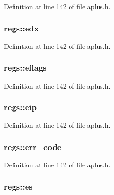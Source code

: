 Definition at line 142 of file aplus.\+h.

\hypertarget{structregs_a63133abf1974301855fe69ef4ee70ef3}{
\subsubsection[{edx}]{ regs\+::edx}}\label{structregs_a63133abf1974301855fe69ef4ee70ef3}


Definition at line 142 of file aplus.\+h.

\hypertarget{structregs_a795e8ffcd28d56b617a2d535b2d1394c}{
\subsubsection[{eflags}]{ regs\+::eflags}}\label{structregs_a795e8ffcd28d56b617a2d535b2d1394c}


Definition at line 142 of file aplus.\+h.

\hypertarget{structregs_a69756a0c0f29041c01160de72c4163b8}{
\subsubsection[{eip}]{ regs\+::eip}}\label{structregs_a69756a0c0f29041c01160de72c4163b8}


Definition at line 142 of file aplus.\+h.

\hypertarget{structregs_a938e9e8adf0d430fefc20bea83650718}{
\subsubsection[{err\+\_\+code}]{ regs\+::err\+\_\+code}}\label{structregs_a938e9e8adf0d430fefc20bea83650718}


Definition at line 142 of file aplus.\+h.

\hypertarget{structregs_aede6adc8400a3e68071ad7a038fbbcc9}{
\subsubsection[{es}]{ regs\+::es}}\label{structregs_aede6adc8400a3e68071ad7a038fbbcc9}


